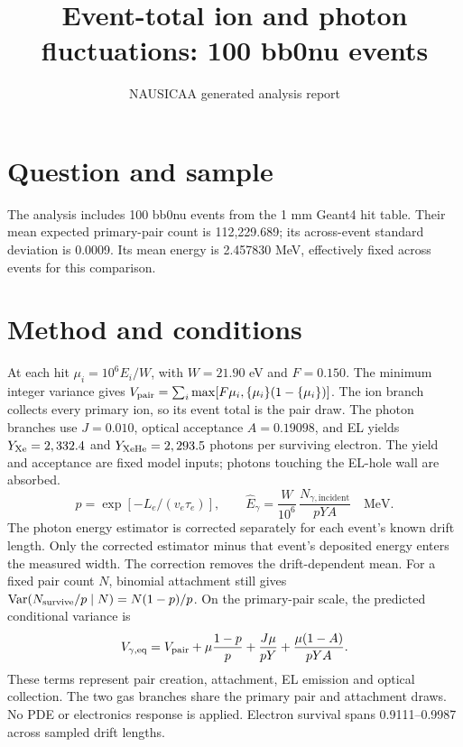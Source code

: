 \documentclass[11pt]{article}
\begin{document}
\title{Event-total ion and photon fluctuations: 100 bb0nu events}
\author{NAUSICAA generated analysis report}
\date{}\maketitle
\section*{Question and sample}
The analysis includes 100 bb0nu events from the 1 mm Geant4 hit table. Their mean expected primary-pair count is 112,229.689; its across-event standard deviation is 0.0009. Its mean energy is 2.457830 MeV, effectively fixed across events for this comparison.
\section*{Method and conditions}
At each hit $\mu_i=10^6E_i/W$, with $W=21.90$ eV and $F=0.150$. The minimum integer variance gives $V_{\rm pair}=\sum_i\max[F\mu_i,\{\mu_i\}(1-\{\mu_i\})]$. The ion branch collects every primary ion, so its event total is the pair draw. The photon branches use $J=0.010$, optical acceptance $A=0.19098$, and EL yields $Y_{\rm Xe}=2,332.4$ and $Y_{\rm XeHe}=2,293.5$ photons per surviving electron. The yield and acceptance are fixed model inputs; photons touching the EL-hole wall are absorbed.
\[p=\exp[-L_e/(v_e\tau_e)],\qquad \widehat E_{\gamma}=\frac{W}{10^6}\,\frac{N_{\gamma,\mathrm{incident}}}{pYA}\quad\mathrm{MeV}.\]
The photon energy estimator is corrected separately for each event's known drift length. Only the corrected estimator minus that event's deposited energy enters the measured width. The correction removes the drift-dependent mean. For a fixed pair count $N$, binomial attachment still gives $\operatorname{Var}(N_{\rm survive}/p\mid N)=N(1-p)/p$. On the primary-pair scale, the predicted conditional variance is
\[V_{\gamma,\mathrm{eq}}=V_{\rm pair}+\mu\frac{1-p}{p}+\frac{J\mu}{pY}+\frac{\mu(1-A)}{pYA}.\]
These terms represent pair creation, attachment, EL emission and optical collection. The two gas branches share the primary pair and attachment draws. No PDE or electronics response is applied.
Electron survival spans 0.9111--0.9987 across sampled drift lengths.
\end{document}
